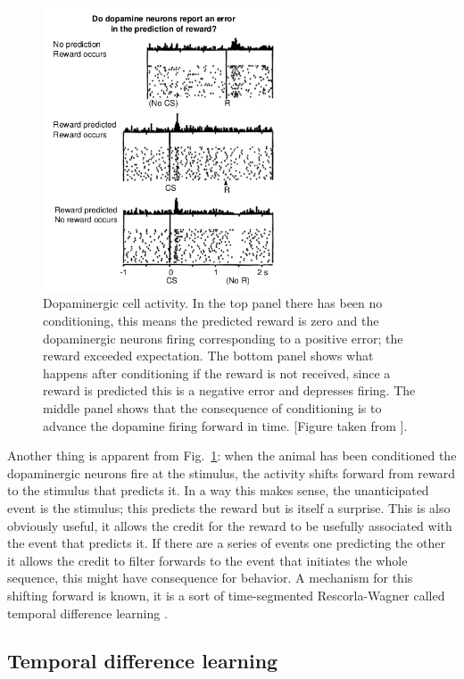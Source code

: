 \documentclass[11pt,a4paper]{scrartcl}
\begin{document}
\begin{figure}
\begin{center}
\includegraphics[width=7cm]{Schultz.png}
\end{center}
\caption{Dopaminergic cell activity. In the top panel there has been
  no conditioning, this means the predicted reward is zero and the
  dopaminergic neurons firing corresponding to a positive error; the
  reward exceeded expectation. The bottom panel shows what happens
  after conditioning if the reward is not received, since a reward is
  predicted this is a negative error and depresses firing. The middle
  panel shows that the consequence of conditioning is to advance the
  dopamine firing forward in time. [Figure taken from \cite{SchultzDayanMontague1997a}]. \label{fig:spikes}}
\end{figure}

Another thing is apparent from Fig.~\ref{fig:spikes}: when the animal
has been conditioned the dopaminergic neurons fire at the stimulus,
the activity shifts forward from reward to the stimulus that predicts
it. In a way this makes sense, the unanticipated event is the
stimulus; this predicts the reward but is itself a surprise. This is
also obviously useful, it allows the credit for the reward to be
usefully associated with the event that predicts it. If there are a
series of events one predicting the other it allows the credit to
filter forwards to the event that initiates the whole sequence, this
might have consequence for behavior. A mechanism for this shifting
forward is known, it is a sort of time-segmented Rescorla-Wagner
called temporal difference learning
\cite{Sutton1988a,SuttonBarto1998a}.

\subsection*{Temporal difference learning}
\end{document}
